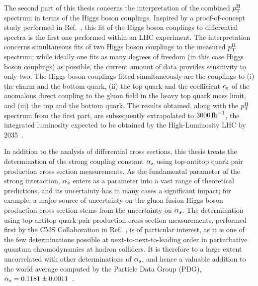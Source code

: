 The second part of this thesis concerns the interpretation of the combined $p_\mathrm{T}^\mathrm{H}$ spectrum in terms of the Higgs boson couplings.
% 
Inspired by a proof-of-concept study performed in Ref.~\cite{Bishara:2016jga}, this fit of the Higgs boson couplings to differential spectra is the first one performed within an LHC experiment.
% 
The interpretation concerns simultaneous fits of two Higgs boson couplings to the measured $p_\mathrm{T}^\mathrm{H}$ spectrum; while ideally one fits as many degrees of freedom (in this case Higgs boson couplings) as possible, the current amount of data provides sensitivity to only two.
% 
The Higgs boson couplings fitted simultaneously are the couplings to (i) the charm and the bottom quark, (ii) the top quark and the coefficient $c_\mathrm{g}$ of the anomalous direct coupling to the gluon field in the heavy top quark mass limit, and (iii) the top and the bottom quark.
% 
The results obtained, along with the $p_\mathrm{T}^\mathrm{H}$ spectrum from the first part, are subsequently extrapolated to $3000\,\text{fb}^{-1}$, the integrated luminosity expected to be obtained by the High-Luminosity LHC by 2035~\cite{hllhc}.


In addition to the analysis of differential cross sections, this thesis treats the determination of the strong coupling constant $\alpha_s$ using top-antitop quark pair production cross section measurements.
% 
As the fundamental parameter of the strong interaction, $\alpha_s$ enters as a parameter into a vast range of theoretical predictions, and its uncertainty has in many cases a significant impact; for example, a major source of uncertainty on the gluon fusion Higgs boson production cross section stems from the uncertainty on $\alpha_s$.
% 
The determination using top-antitop quark pair production cross section measurements, performed first by the CMS Collaboration in Ref.~\cite{Chatrchyan:2013haa}, is of particular interest, as it is one of the few determinations possible at next-to-next-to-leading order in perturbative quantum chromodynamics at hadron colliders.
% 
It is therefore to a large extent uncorrelated with other determinations of $\alpha_s$, and hence a valuable addition to the world average computed by the Particle Data Group (PDG), $\alpha_s = 0.1181 \pm 0.0011$~\cite{pdg}.



